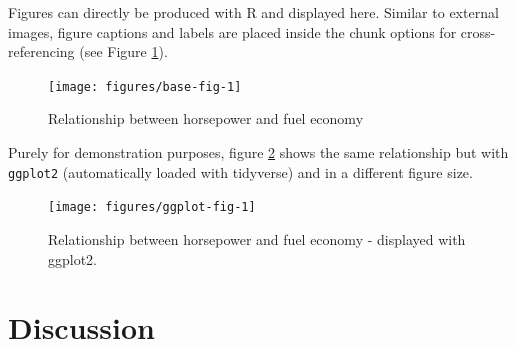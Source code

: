 \documentclass[a4paper,12pt]{article}
\begin{document}
Figures can directly be produced with R and displayed here. Similar to external images, figure captions and labels are placed inside the chunk options for cross-referencing (see Figure \ref{fig:base-fig}).
\begin{figure}

{\centering \texttt{[image: figures/base-fig-1]} 

}

\caption{Relationship between horsepower and fuel economy}\label{fig:base-fig}
\end{figure}
Purely for demonstration purposes, figure \ref{fig:ggplot-fig} shows the same relationship but with \texttt{ggplot2} (automatically loaded with tidyverse) and in a different figure size.
\begin{figure}

{\centering \texttt{[image: figures/ggplot-fig-1]} 

}

\caption{Relationship between horsepower and fuel economy - displayed with ggplot2.}\label{fig:ggplot-fig}
\end{figure}
\hypertarget{discussion}{%
\section{Discussion}\label{discussion}}
\end{document}
